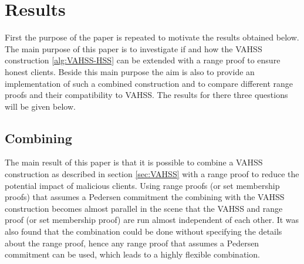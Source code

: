 \chapter{Results}
\label{ch:results}

First the purpose of the paper is repeated to motivate the results obtained below. The main purpose of this paper is to investigate if  and how the VAHSS construction \ref{alg:VAHSS-HSS} can be extended with a range proof to ensure honest clients. Beside this main purpose the aim is also to provide an implementation of such a combined construction and to compare different range proofs and their compatibility to VAHSS. The results for there three questions will be given below.

\section{Combining}
The main result of this paper is that it is possible to combine a VAHSS construction as described in section \ref{sec:VAHSS} with a range proof to reduce the potential impact of malicious clients. Using range proofs (or set membership proofs) that assumes a Pedersen commitment the combining with the VAHSS construction becomes almost parallel in the scene that the VAHSS and range proof (or set membership proof) are run almost independent of each other. It was also found that the combination could be done without specifying the details about the range proof, hence any range proof that assumes a Pedersen commitment can be used, which leads to a highly flexible combination.  

